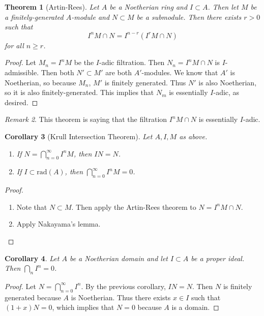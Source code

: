 \documentclass[leqno, openany]{memoir}
\newtheorem{thm}{Theorem}[section]
\newtheorem{cor}[thm]{Corollary}
\theoremstyle{definition}
\theoremstyle{remark}
\newtheorem{rmk}[thm]{Remark}
\theoremstyle{plain}
\theoremstyle{definition}
\theoremstyle{remark}
\newcommand{\mr}[1]{\mathrm{#1}}
\begin{document}
\begin{thm}[Artin-Rees]
    Let $A$ be a Noetherian ring and $I \subset A$. Then let $M$ be a finitely-generated $A$-module and $N \subset M$ be a submodule. Then there exists $r > 0$ such that
    \[ I^n M \cap N = I^{n-r} (I^r M \cap N) \]
    for all $n \geq r$.
\end{thm}

\begin{proof}
    Let $M_n = I^n M$ be the $I$-adic filtration. Then $N_n = I^n M \cap N$ is $I$-admissible. Then both $N' \subset M'$ are both $A'$-modules. We know that $A'$ is Noetherian, so because $M_n$, $M'$ is finitely generated. Thus $N'$ is also Noetherian, so it is also finitely-generated. This implies that $N_m$ is essentially $I$-adic, as desired.
\end{proof}

\begin{rmk}
    This theorem is saying that the filtration $I^n M \cap N$ is essentially $I$-adic.
\end{rmk}

\begin{cor}[Krull Intersection Theorem]
    Let $A, I, M$ as above.
    \begin{enumerate}
        \item If $N = \bigcap_{n=0}^{\infty } I^n M$, then $IN = N$.
        \item If $I \subset \mr{rad}(A)$, then $\bigcap_{n=0}^{\infty} I^n M = 0$.
    \end{enumerate}
\end{cor}

\begin{proof}
    \begin{enumerate}
        \item Note that $N \subset M$. Then apply the Artin-Rees theorem to $N = I^n M \cap N$.
        \item Apply Nakayama's lemma. \qedhere
    \end{enumerate}
\end{proof}

\begin{cor}
    Let $A$ be a Noetherian domain and let $I \subset A$ be a proper ideal. Then $\bigcap_n I^n = 0$.
\end{cor}

\begin{proof}
    Let $N = \bigcap_{n=0}^{\infty} I^n$. By the previous corollary, $IN = N$. Then $N$ is finitely generated because $A$ is Noetherian. Thus there exists $x \in I$ such that $(1+x)N = 0$, which implies that $N = 0$ because $A$ is a domain.
\end{proof}
\end{document}

